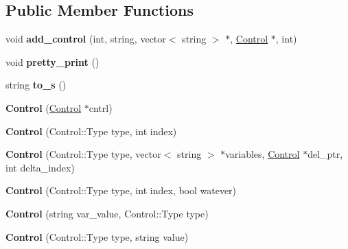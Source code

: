 \subsection*{Public Member Functions}
\begin{DoxyCompactItemize}
\item 
\hypertarget{classControl_adb66fdbee92286e1229ca609e545cc4d}{
void {\bfseries add\_\-control} (int, string, vector$<$ string $>$ $\ast$, \hyperlink{classControl}{Control} $\ast$, int)}
\label{classControl_adb66fdbee92286e1229ca609e545cc4d}

\item 
\hypertarget{classControl_a253c2963cf1561f52e3212a2a91dd09a}{
void {\bfseries pretty\_\-print} ()}
\label{classControl_a253c2963cf1561f52e3212a2a91dd09a}

\item 
\hypertarget{classControl_a4c41c3158d8913e39e10f207d59592ff}{
string {\bfseries to\_\-s} ()}
\label{classControl_a4c41c3158d8913e39e10f207d59592ff}

\item 
\hypertarget{classControl_a578b3b8a92a99a8924bbaaa35765caa6}{
{\bfseries Control} (\hyperlink{classControl}{Control} $\ast$cntrl)}
\label{classControl_a578b3b8a92a99a8924bbaaa35765caa6}

\item 
\hypertarget{classControl_aed0474eda3fbba2470cfdd5865cdf95e}{
{\bfseries Control} (Control::Type type, int index)}
\label{classControl_aed0474eda3fbba2470cfdd5865cdf95e}

\item 
\hypertarget{classControl_a6f035fbbd272ba6a877554cb9c46846b}{
{\bfseries Control} (Control::Type type, vector$<$ string $>$ $\ast$variables, \hyperlink{classControl}{Control} $\ast$del\_\-ptr, int delta\_\-index)}
\label{classControl_a6f035fbbd272ba6a877554cb9c46846b}

\item 
\hypertarget{classControl_ac37be7f2ad830c2a56337ae86e8a8e4e}{
{\bfseries Control} (Control::Type type, int index, bool watever)}
\label{classControl_ac37be7f2ad830c2a56337ae86e8a8e4e}

\item 
\hypertarget{classControl_af4d697c95ee5886169013e12ef016f34}{
{\bfseries Control} (string var\_\-value, Control::Type type)}
\label{classControl_af4d697c95ee5886169013e12ef016f34}

\item 
\hypertarget{classControl_a2b72ec8881d3e7261feb61999b5ea8f2}{
{\bfseries Control} (Control::Type type, string value)}
\label{classControl_a2b72ec8881d3e7261feb61999b5ea8f2}


\end{DoxyCompactItemize}
